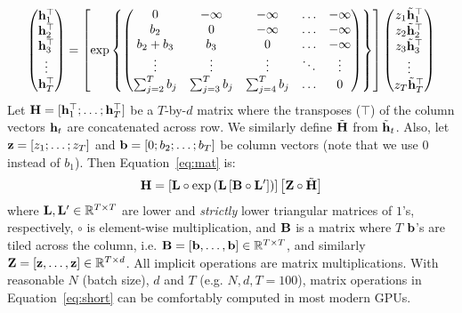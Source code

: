 \documentclass[table]{article}
\begin{document}
\begin{equation}\label{eq:mat}
\begin{pmatrix}
{\bf h}_1^\top \\
{\bf h}_2^\top \\
{\bf h}_3^\top \\
\vdots \\
{\bf h}_T^\top
\end{pmatrix}
 = \left[
 \exp\left\{
 \begin{pmatrix}
 0 & -\infty & -\infty & \ldots & -\infty \\
 b_2  & 0 & -\infty & \ldots & -\infty\\
 b_2 +b_3  & b_3 & 0 & \ldots & -\infty\\
 \vdots & \vdots & \vdots & \ddots & \vdots\\
 \sum_{j=2}^T b_j & \sum_{j=3}^T b_j & \sum_{j=4}^T b_j &\ldots & 0
 \end{pmatrix}\right\}
\right]
\begin{pmatrix}
z_1 \tilde{{\bf h}}^\top_1 \\
z_2\tilde{{\bf h}}^\top_2 \\
z_3\tilde{{\bf h}}^\top_3 \\
\vdots \\
z_T\tilde{{\bf h}}^\top_T
\end{pmatrix}
\end{equation}
Let ${\bf H} = [{\bf h}_1^\top ; \ldots ; {\bf h}_T^\top]$ 
be a $T$-by-$d$ matrix where the transposes ($\top$) of the column vectors ${\bf h}_t$ are concatenated across row.
We similarly define $\tilde{{\bf H}}$ from $\tilde{{\bf h}}_t$. 
Also, let ${\bf z}=[z_1; \ldots ; z_T]$ and ${\bf b}=[0; b_2; \dots ; b_T]$ be column vectors (note that we use $0$ instead of $b_1$).
Then Equation~\ref{eq:mat} is: 
\begin{equation}\label{eq:short}
{\bf H} = \left[ {\bf L} \circ \exp \left( {\bf L}\left[{\bf B} \circ {\bf L}'\right]\right) \right]
 \left[ {\bf Z} \circ \tilde{{\bf H}} \right]
\end{equation}
where ${\bf L}, {\bf L}' \in \mathbb{R}^{T \times T}$ are lower and \emph{strictly} lower triangular matrices of $1$'s, respectively, 
$\circ$ is element-wise multiplication, and
${\bf B}$ is a matrix where $T$ ${\bf b}$'s are tiled across the column, i.e. ${\bf B} = [{\bf b}, \dots , {\bf b}] \in \mathbb{R}^{T \times T}$, 
and similarly ${\bf Z} = [{\bf z}, \dots , {\bf z}] \in \mathbb{R}^{T \times d}$. 
All implicit operations are matrix multiplications.
With reasonable $N$ (batch size), $d$ and $T$ (e.g. $ N,d,T=100$), matrix operations in Equation~\ref{eq:short} can be comfortably computed in most modern GPUs.
\end{document}
